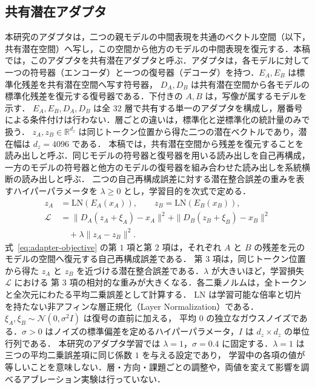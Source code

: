 \documentclass[techrep,noauthor]{ipsj}
\begin{document}
\subsection{共有潜在アダプタ}\label{sec:adapter}
本研究のアダプタは，二つの親モデルの中間表現を共通のベクトル空間（以下，共有潜在空間）へ写し，この空間から他方のモデルの中間表現を復元する．本稿では，このアダプタを共有潜在アダプタと呼ぶ．アダプタは，各モデルに対して一つの符号器（エンコーダ）と一つの復号器（デコーダ）を持つ．$E_A,E_B$ は標準化残差を共有潜在空間へ写す符号器，
$D_A,D_B$ は共有潜在空間から各モデルの標準化残差を復元する復号器である．下付きの $A,B$ は，写像が属するモデルを示す．
$E_A,E_B,D_A,D_B$ は全 $32$ 層で共有する単一のアダプタを構成し，層番号による条件付けは行わない．層ごとの違いは，標準化と逆標準化の統計量のみで扱う．
$z_A,z_B\in\mathbb R^{d_z}$ は同じトークン位置から得た二つの潜在ベクトルであり，潜在幅は $d_z{=}4096$ である．
本稿では，共有潜在空間から残差を復元することを読み出しと呼ぶ．同じモデルの符号器と復号器を用いる読み出しを自己再構成，
一方のモデルの符号器と他方のモデルの復号器を組み合わせた読み出しを系統横断の読み出しと呼ぶ．
二つの自己再構成誤差に対する潜在整合誤差の重みを表すハイパーパラメータを $\lambda\geq0$ とし，学習目的を次式で定める．
\begin{equation}\label{eq:adapter-objective}
\begin{aligned}
z_A &= \mathrm{LN}(E_A(x_A)),\qquad z_B = \mathrm{LN}(E_B(x_B)),\\
\mathcal{L} &=
\|D_A(z_A{+}\xi_A){-}x_A\|^2+\|D_B(z_B{+}\xi_B){-}x_B\|^2\\
&\quad+\lambda\|z_A{-}z_B\|^2 .
\end{aligned}
\end{equation}
式~\eqref{eq:adapter-objective} の第 $1$ 項と第 $2$ 項は，それぞれ $A$ と $B$ の残差を元のモデルの空間へ復元する自己再構成誤差である．
第 $3$ 項は，同じトークン位置から得た $z_A$ と $z_B$ を近づける潜在整合誤差である．$\lambda$ が大きいほど，学習損失 $\mathcal L$ における
第 $3$ 項の相対的な重みが大きくなる．各二乗ノルムは，全トークンと全次元にわたる平均二乗誤差として計算する．
$\mathrm{LN}$ は学習可能な倍率と切片を持たない非アフィンな層正規化（Layer Normalization）である．$\xi_A,\xi_B\sim\mathcal N(0,\sigma^2 I)$ は復号の直前に加える，
平均 $0$ の独立なガウスノイズである．$\sigma>0$ はノイズの標準偏差を定めるハイパーパラメータ，$I$ は $d_z{\times}d_z$ の単位行列である．
本研究のアダプタ学習では $\lambda{=}1$，$\sigma{=}0.4$ に固定する．$\lambda{=}1$ は三つの平均二乗誤差項に同じ係数 $1$ を与える設定であり，
学習中の各項の値が等しいことを意味しない．層・方向・課題ごとの調整や，両値を変えて影響を調べるアブレーション実験は行っていない．
\end{document}
